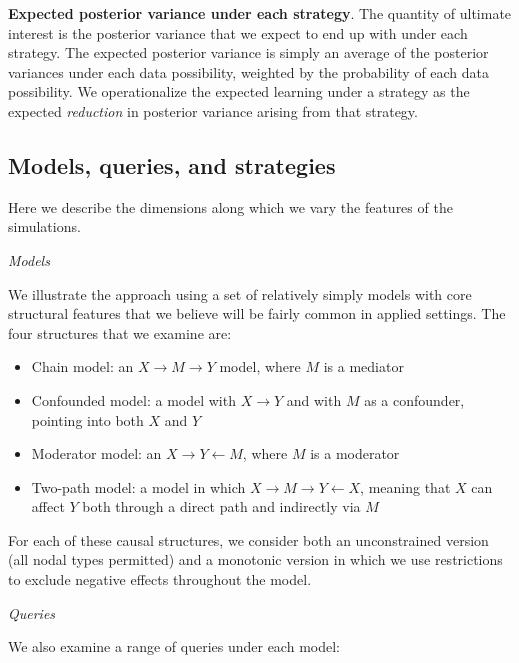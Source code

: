 \documentclass[
  12pt,
]{book}
\providecommand{\tightlist}{%
  \setlength{\itemsep}{0pt}\setlength{\parskip}{0pt}}
\begin{document}
\textbf{Expected posterior variance under each strategy}. The quantity of ultimate interest is the posterior variance that we expect to end up with under each strategy. The expected posterior variance is simply an average of the posterior variances under each data possibility, weighted by the probability of each data possibility. We operationalize the expected learning under a strategy as the expected \emph{reduction} in posterior variance arising from that strategy.

\hypertarget{models-queries-and-strategies}{%
\subsection{Models, queries, and strategies}\label{models-queries-and-strategies}}

Here we describe the dimensions along which we vary the features of the simulations.

\emph{Models}

We illustrate the approach using a set of relatively simply models with core structural features that we believe will be fairly common in applied settings. The four structures that we examine are:

\begin{itemize}
\tightlist
\item
  Chain model: an \(X \rightarrow M \rightarrow Y\) model, where \(M\) is a mediator
\item
  Confounded model: a model with \(X \rightarrow Y\) and with \(M\) as a confounder, pointing into both \(X\) and \(Y\)
\item
  Moderator model: an \(X \rightarrow Y \leftarrow M\), where \(M\) is a moderator
\item
  Two-path model: a model in which \(X \rightarrow M \rightarrow Y \leftarrow X\), meaning that \(X\) can affect \(Y\) both through a direct path and indirectly via \(M\)
\end{itemize}

For each of these causal structures, we consider both an unconstrained version (all nodal types permitted) and a monotonic version in which we use restrictions to exclude negative effects throughout the model.

\emph{Queries}

We also examine a range of queries under each model:
\end{document}
